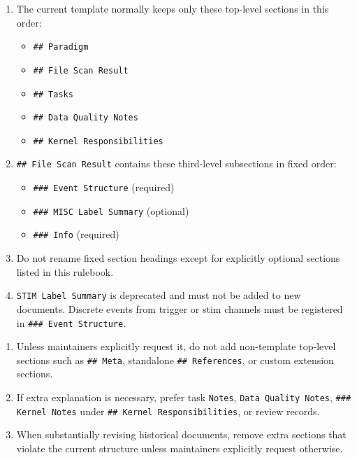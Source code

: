 \begin{tcolorbox}
\begin{enumerate}[leftmargin=1.5em,noitemsep,topsep=2pt]
\item The current template normally keeps only these top-level sections in this order:
\begin{itemize}[leftmargin=1.2em,noitemsep,topsep=1pt]
\item \texttt{\#\# Paradigm}
\item \texttt{\#\# File Scan Result}
\item \texttt{\#\# Tasks}
\item \texttt{\#\# Data Quality Notes}
\item \texttt{\#\# Kernel Responsibilities}
\end{itemize}
\item \texttt{\#\# File Scan Result} contains these third-level subsections in fixed order:
\begin{itemize}[leftmargin=1.2em,noitemsep,topsep=1pt]
\item \texttt{\#\#\# Event Structure} (required)
\item \texttt{\#\#\# MISC Label Summary} (optional)
\item \texttt{\#\#\# Info} (required)
\end{itemize}
\item Do not rename fixed section headings except for explicitly optional sections listed in this rulebook.
\item \texttt{STIM Label Summary} is deprecated and must not be added to new documents. Discrete events from trigger or stim channels must be registered in \texttt{\#\#\# Event Structure}.
\end{enumerate}

\smallskip{}\par\smallskip

\begin{enumerate}[leftmargin=1.5em,noitemsep,topsep=2pt]
\item Unless maintainers explicitly request it, do not add non-template top-level sections such as \texttt{\#\# Meta}, standalone \texttt{\#\# References}, or custom extension sections.
\item If extra explanation is necessary, prefer task \texttt{Notes}, \texttt{Data Quality Notes}, \texttt{\#\#\# Kernel Notes} under \texttt{\#\# Kernel Responsibilities}, or review records.
\item When substantially revising historical documents, remove extra sections that violate the current structure unless maintainers explicitly request otherwise.
\end{enumerate}


\end{tcolorbox}
